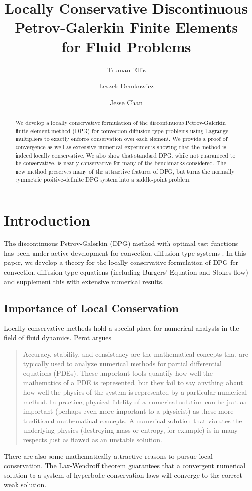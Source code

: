 \documentclass[letterpaper]{article}
\title{Locally Conservative Discontinuous Petrov-Galerkin Finite Elements for
Fluid Problems}
\author{Truman Ellis}
\author{Leszek Demkowicz}
\author{Jesse Chan}
\affil{Institute for Computational Engineering and Sciences,\\
The University of Texas at Austin, \\
Austin, TX 78712}
\date{}
\begin{document}
\maketitle

\begin{abstract}
We develop a locally conservative formulation of the discontinuous
Petrov-Galerkin finite element method (DPG) for convection-diffusion type
problems using Lagrange multipliers to exactly enforce conservation over each
element. We provide a proof of convergence as well as extensive numerical
experiments showing that the method is indeed locally conservative. We also
show that standard DPG, while not guaranteed to be conservative, is nearly
conservative for many of the benchmarks considered. The new method preserves many of
the attractive features of DPG, but turns the normally symmetric
positive-definite DPG system into a saddle-point problem.
\end{abstract}

\section{Introduction}
The discontinuous Petrov-Galerkin (DPG) method with optimal test functions has
been under active development for convection-diffusion type systems
\cite{DPG1, DPG2, DPG3, DPG5, DemkowiczHeuer, ChanHeuerThanhDemkowicz2012,
MoroNguyenPeraire11}. In this paper, we develop a theory for the locally
conservative formulation of DPG for convection-diffusion type equations
(including Burgers' Equation and Stokes flow) and supplement this with
extensive numerical results.

\subsection{Importance of Local Conservation}
Locally conservative methods hold a special place for numerical analysts in
the field of fluid dynamics.
Perot\cite{Perot2011} argues
\begin{quote}
Accuracy, stability, and consistency are the mathematical concepts that are
typically used to analyze numerical methods for partial differential equations
(PDEs). These important tools quantify how well the mathematics of a PDE is
represented, but they fail to say anything about how well the physics of the
system is represented by a particular numerical method. In practice, physical
fidelity of a numerical solution can be just as important (perhaps even more
important to a physicist) as these more traditional mathematical concepts. A
numerical solution that violates the underlying physics (destroying mass or
entropy, for example) is in many respects just as flawed as an unstable
solution.
\end{quote}
There are also some mathematically attractive reasons to pursue local
conservation. The Lax-Wendroff theorem guarantees that a convergent numerical
solution to a system of hyperbolic conservation laws will converge to the
correct weak solution.
\end{document}
